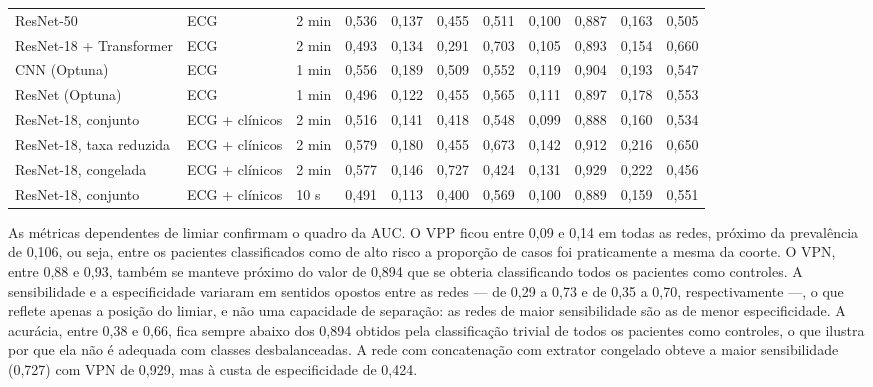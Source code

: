 \begin{table}[h!]
{\begin{tabular}{lllcccccccc}
			ResNet-50 & ECG & 2 min & 0,536 & 0,137 & 0,455 & 0,511 & 0,100 & 0,887 & 0,163 & 0,505 \\
			ResNet-18 + Transformer & ECG & 2 min & 0,493 & 0,134 & 0,291 & 0,703 & 0,105 & 0,893 & 0,154 & 0,660 \\
			\midrule
			CNN (Optuna) & ECG & 1 min & 0,556 & 0,189 & 0,509 & 0,552 & 0,119 & 0,904 & 0,193 & 0,547 \\
			ResNet (Optuna) & ECG & 1 min & 0,496 & 0,122 & 0,455 & 0,565 & 0,111 & 0,897 & 0,178 & 0,553 \\
			\midrule
			ResNet-18, conjunto & ECG + clínicos & 2 min & 0,516 & 0,141 & 0,418 & 0,548 & 0,099 & 0,888 & 0,160 & 0,534 \\
			ResNet-18, taxa reduzida & ECG + clínicos & 2 min & 0,579 & 0,180 & 0,455 & 0,673 & 0,142 & 0,912 & 0,216 & 0,650 \\
			ResNet-18, congelada & ECG + clínicos & 2 min & 0,577 & 0,146 & 0,727 & 0,424 & 0,131 & 0,929 & 0,222 & 0,456 \\
			ResNet-18, conjunto & ECG + clínicos & 10 s & 0,491 & 0,113 & 0,400 & 0,569 & 0,100 & 0,889 & 0,159 & 0,551 \\
			\bottomrule
		\end{tabular}
	}{
}
\end{table}


As métricas dependentes de limiar confirmam o quadro da \gls{AUC}. O
\gls{VPP} ficou entre 0,09 e 0,14 em todas as redes, próximo da prevalência
de 0,106, ou seja, entre os pacientes classificados como de alto risco a
proporção de casos foi praticamente a mesma da coorte. O \gls{VPN}, entre
0,88 e 0,93, também se manteve próximo do valor de 0,894 que se obteria
classificando todos os pacientes como controles. A sensibilidade e a
especificidade variaram em sentidos opostos entre as redes --- de 0,29 a
0,73 e de 0,35 a 0,70, respectivamente ---, o que reflete apenas a posição
do limiar, e não uma capacidade de separação: as redes de maior
sensibilidade são as de menor especificidade. A acurácia, entre 0,38 e 0,66,
fica sempre abaixo dos 0,894 obtidos pela classificação trivial de todos os
pacientes como controles, o que ilustra por que ela não é adequada com
classes desbalanceadas. A rede com concatenação com extrator congelado obteve a
maior sensibilidade (0,727) com \gls{VPN} de 0,929, mas à custa de
especificidade de 0,424.

